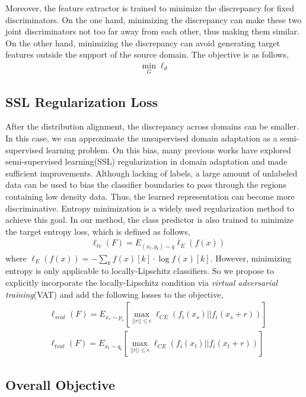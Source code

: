 \documentclass{ecai}
\begin{document}
Moreover, the feature extractor is trained to minimize the discrepancy for fixed discriminators. On the one hand, minimizing the discrepancy can make these two joint discriminators not too far away from each other, thus making them similar. On the other hand, minimizing the discrepancy can avoid generating target features outside the support of the source domain\cite{b24}. The objective is as follows,
\begin{align}
\min_{G} \ell_{d}
\end{align}

\subsection{SSL Regularization Loss}
After the distribution alignment, the discrepancy across domains can be smaller. In this case, we can approximate the unsupervised domain adaptation as a semi-supervised learning problem. On this bias, many previous works have explored semi-supervised learning(SSL)  regularization in  domain adaptation\cite{b17,b30} and made sufficient improvements. Although lacking of labels, a large amount of unlabeled data can be used to bias the classifier boundaries to pass through the regions containing low density data. Thus, the learned representation can become more discriminative. Entropy minimization is a widely used  regularization method to achieve this goal. In our method, the class predictor is also trained to minimize the target entropy loss, which is defined as follows,
\begin{align}
& \ell_{te}(F) = E_{(x_t,y_t)\sim q}\ell_E(f(x))
\end{align}
where $\ell_E(f(x)) = -\sum_kf(x)[k] \cdot \log{f(x)[k]}$. However, minimizing entropy is only applicable to locally-Lipschitz classifiers\cite{b21}. So we propose to explicitly incorporate the locally-Lipschitz condition via {\emph{virtual adversarial training}}(VAT) and add the following losses to the objective,
\begin{align}
& \ell_{svat}(F) = E_{x_s \sim p_s}[\max_{||r|| \leq \epsilon}\ell_{CE}(f_i(x_s)||f_i(x_s+r))] \\
& \ell_{tvat}(F) = E_{x_t \sim q_t}[\max_{||r|| \leq \epsilon}\ell_{CE}(f_i(x_t)||f_i(x_t+r))]
\end{align}



\subsection{Overall Objective}
\end{document}
